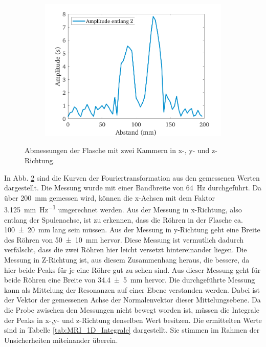 \documentclass[../../main.tex]{subfiles}
\begin{document}
\begin{figure}[H]
\begin{subfigure}[c]{0.5\textwidth}
                \includegraphics[width=\linewidth]{Bilddateien/12/Z/Fig_1}
                \label{fig:MRI_1D_Z}
            \end{subfigure}
            \caption{Abmessungen der Flasche mit zwei Kammern in x-, y- und z-Richtung.}
            \label{fig:MRI_1D}
        \end{figure} 
        In Abb. \ref{fig:MRI_1D} sind die Kurven der Fouriertransformation aus den gemessenen Werten dargestellt. Die Messung wurde mit einer Bandbreite von \SI{64}{\hertz} durchgeführt. Da über \SI{200}{\milli \metre} gemessen wird, können die x-Achsen mit dem Faktor \SI{3,125}{\milli \metre \per \hertz} umgerechnet werden. Aus der Messung in x-Richtung, also entlang der Spulenachse, ist zu erkennen, dass die Röhren in der Flasche ca. \SI{100 +- 20}{\milli \metre} lang sein müssen. Aus der Messung in y-Richtung geht eine Breite des Röhren von \SI{50 +- 10}{\milli \metre} hervor. Diese Messung ist vermutlich dadurch verfälscht, dass die zwei Röhren hier leicht versetzt hintereinander liegen. Die Messung in Z-Richtung ist, aus diesem Zusammenhang heraus, die bessere, da hier beide Peaks für je eine Röhre gut zu sehen sind. Aus dieser Messung geht für beide Röhren eine Breite von \SI{34,4 +- 5}{\milli \metre} hervor. Die durchgeführte Messung kann als Mittelung der Resonanzen auf einer Ebene verstanden werden. Dabei ist der Vektor der gemessenen Achse der Normalenvektor dieser \glqq{}Mittelungsebene\grqq{}. Da die Probe zwischen den Messungen nicht bewegt worden ist, müssen die Integrale der Peaks in x-,y- und z-Richtung denselben Wert besitzen. Die ermittelten Werte sind in Tabelle \ref{tab:MRI_1D_Integrale} dargestellt. Sie stimmen im Rahmen der Unsicherheiten miteinander überein.
\end{document}
